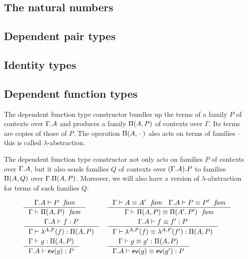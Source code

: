 \subsection{The natural numbers}

\subsection{Dependent pair types}

\subsection{Identity types}

\subsection{Dependent function types}
The dependent function type constructor bundles up the terms of a family $P$
of contexts over $\ctxext{\Gamma}{A}$ and produces a family $\Pi(A,P)$ of
contexts over $\Gamma$. Its terms are copies of those of $P$. The operation
$\Pi(A,\mathord{\hspace{1pt}\text{--}\hspace{1pt}})$ also acts on terms of families -- this is called
$\lambda$-abstraction.

The dependent function type constructor not only acts on families $P$ of
contexts over $\ctxext{\Gamma}{A}$, but it also sends families $Q$ of contexts
over $\ctxext{{\Gamma}{A}}{P}$ to families $\Pi(A,Q)$ over $\ctxext{\Gamma}
{\mprd{A}{P}}$. Moreover, we will also have a version of $\lambda$-abstraction
for terms of such families $Q$.

\begin{align*}
& \inference
    { \jfam{{\Gamma}{A}}{P}
      }
    { \jfam{\Gamma}{\mprd{A}{P}}
      }
& & \inference
      { \jfameq{\Gamma}{A}{A'}
        \jfameq{{\Gamma}{A}}{P}{P'}
        }
      { \jfameq{\Gamma}{\mprd{A}{P}}{\mprd{A'}{P'}}
        }
  \\
& \inference
    { \jterm{{\Gamma}{A}}{P}{f}
      }
    { \jterm{\Gamma}{\mprd{A}{P}}{\slam{A}{P}{f}}
      }
& & \inference
      { \jtermeq{{\Gamma}{A}}{P}{f}{f'}
        }
      { \jtermeq{\Gamma}{\mprd{A}{P}}{\slam{A}{P}{f}}{\slam{A}{P}{f'}}
        }
  \\
& \inference
    { \jterm{\Gamma}{\mprd{A}{P}}{g}
      }
    { \jterm{{\Gamma}{A}}{P}{\sev{g}}
      }
& & \inference
      { \jtermeq{\Gamma}{\mprd{A}{P}}{g}{g'}
        }
      { \jtermeq{{\Gamma}{A}}{P}{\sev{g}}{\sev{g'}}
        }
\end{align*}

